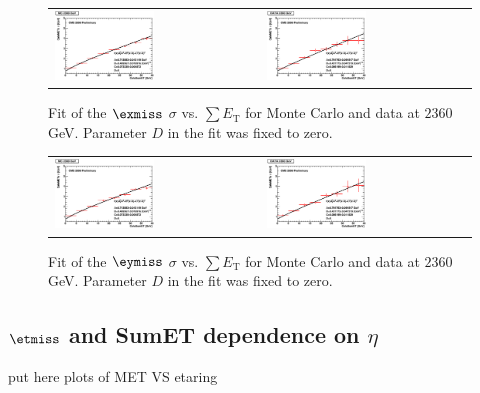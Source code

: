 \begin{figure}[h!]
 \centering
 \begin{tabular}{ll}
  \includegraphics[width=0.5\textwidth]{plots_DataVsMC_MB_2360GeV/final_metxsigma_sumet_MC_2360.eps} &
  \includegraphics[width=0.5\textwidth]{plots_DataVsMC_MB_2360GeV/final_metxsigma_sumet_DATA_2360.eps} \\
 \end{tabular}
 \caption{\small Fit of the $\exmiss$ $\sigma$ vs. $\sum E_\text{T}$ for Monte Carlo and data at $2360$ GeV. Parameter $D$ in the fit was fixed
          to zero.\label{fig:MExSigma_vs_SumET_2360_fit}}
\end{figure}

\begin{figure}[h!]
 \centering
 \begin{tabular}{ll}
  \includegraphics[width=0.5\textwidth]{plots_DataVsMC_MB_2360GeV/final_metysigma_sumet_MC_2360.eps} &
  \includegraphics[width=0.5\textwidth]{plots_DataVsMC_MB_2360GeV/final_metysigma_sumet_DATA_2360.eps} \\
 \end{tabular}
 \caption{\small Fit of the $\eymiss$ $\sigma$ vs. $\sum E_\text{T}$ for Monte Carlo and data at $2360$ GeV. Parameter $D$ in the fit was fixed
          to zero.\label{fig:MExSigma_vs_SumET_2360_fit}}
\end{figure}

\subsection{$\etmiss$ and SumET dependence on $\eta$}
put here plots of MET VS etaring

